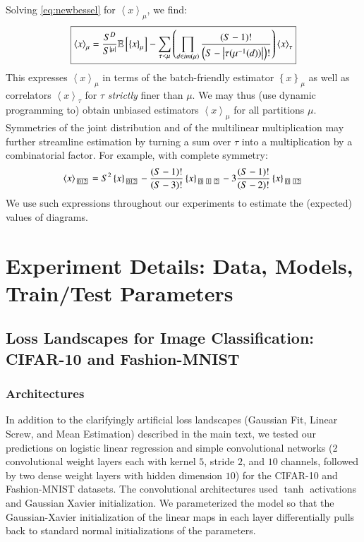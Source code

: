 \documentclass{article}
\theoremstyle{plain}
\theoremstyle{definition}
\newcommand{\expct}[1]{\mathbb{E}\left[#1\right]}
\newcommand{\wrap}[1]{\left(#1\right)}
\newcommand{\wang}[1]{\left\langle#1\right\rangle}
\newcommand{\wabs}[1]{\left|#1\right|}
\newcommand{\wurl}[1]{\left\{#1\right\}}
\newcommand{\partbox}[1]{
    \text{
        \fboxsep=0.5pt
        \tiny
        \fbox{#1}
    }
}
\begin{document}
    Solving \ref{eq:newbessel} for $\wang{x}_\mu$, we find:
    \begin{equation*}
        \text{\fbox{$
        \wang{x}_\mu
        =
        \frac{S^D}{S^{\wabs{\mu}}}
        \expct{
            \wurl{x}_\mu
        }
        -
        \sum_{\tau < \mu} \wrap{
            \prod_{d\in im(\mu)}
            \frac{\wrap{S-1}!}{\wrap{S-\wabs{\tau(\mu^{-1}(d))}}!}
        }
        \wang{x}_\tau
        $}}
    \end{equation*}
    This expresses $\wang{x}_\mu$ in terms of the batch-friendly estimator
    $\wurl{x}_\mu$ as well as correlators $\wang{x}_\tau$ for $\tau$ 
    \emph{strictly} finer than $\mu$.  We may thus (use dynamic programming to)
    obtain unbiased estimators $\wang{x}_\mu$ for all partitions $\mu$. 
    Symmetries of the joint distribution and of the multilinear multiplication
    may further streamline estimation by turning a sum over $\tau$ into a
    multiplication by a combinatorial factor.  For example, with complete
    symmetry:
    $$
        \wang{x}_{\partbox{012}}
        =
        S^2
        \wurl{x}_{\partbox{012}}
        -
        \frac{(S-1)!}{(S-3)!}
        \wurl{x}_{\partbox{0}\partbox{1}\partbox{2}}
        -
        3\frac{(S-1)!}{(S-2)!}
        \wurl{x}_{\partbox{0}\partbox{12}}
    $$
    We use such expressions throughout our experiments to estimate the
    (expected) values of diagrams.




\section{Experiment Details: Data, Models, Train/Test Parameters}\label{sect:landscape}
    \subsection{Loss Landscapes for Image Classification: CIFAR-10 and Fashion-MNIST}
        \subsubsection*{Architectures}
            In addition to the clarifyingly artificial loss landscapes (Gaussian
            Fit, Linear Screw, and Mean Estimation) described in the main text, we
            tested our predictions on logistic linear regression and simple
            convolutional networks (2 convolutional weight layers each with kernel
            $5$, stride $2$, and $10$ channels, followed by two dense weight layers
            with hidden dimension $10$) for the CIFAR-10 and Fashion-MNIST
            datasets.  The convolutional architectures used $\tanh$ activations and
            Gaussian Xavier initialization.  We parameterized the model so that the
            Gaussian-Xavier initialization of the linear maps in each layer
            differentially pulls back to standard normal initializations of the
            parameters.
            
\end{document}
